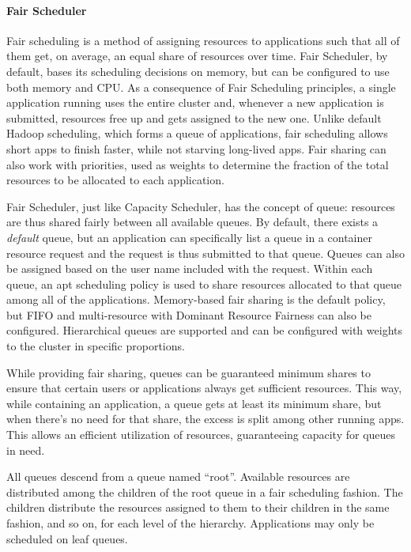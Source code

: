 \paragraph{Fair Scheduler}

Fair scheduling is a method of assigning resources to applications such that all of them get, on average, an equal share of resources over time. Fair Scheduler, by default, bases its scheduling decisions on memory, but can be configured to use both memory and CPU. As a consequence of Fair Scheduling principles, a single application running uses the entire cluster and, whenever a new application is submitted, resources free up and gets assigned to the new one. Unlike default Hadoop scheduling, which forms a queue of applications, fair scheduling allows short apps to finish faster, while not starving long-lived apps. Fair sharing can also work with priorities, used as weights to determine the fraction of the total resources to be allocated to each application.

Fair Scheduler, just like Capacity Scheduler, has the concept of queue: resources are thus shared fairly between all available queues. By default, there exists a \textit{default} queue, but an application can specifically list a queue in a container resource request and the request is thus submitted to that queue. Queues can also be assigned based on the user name included with the request. Within each queue, an apt scheduling policy is used to share resources allocated to that queue among all of the applications. Memory-based fair sharing is the default policy, but FIFO and multi-resource with Dominant Resource Fairness \cite{Ghodsi:2011:DRF:1972457.1972490} can also be configured. Hierarchical queues are supported and can be configured with weights to the cluster in specific proportions. 

While providing fair sharing, queues can be guaranteed minimum shares to ensure that certain users or applications always get sufficient resources. This way, while containing an application, a queue gets at least its minimum share, but when there's no need for that share, the excess is split among other running apps. This allows an efficient utilization of resources, guaranteeing capacity for queues in need.

All queues descend from a queue named “root”. Available resources are distributed among the children of the root queue in a fair scheduling fashion. The children distribute the resources assigned to them to their children in the same fashion, and so on, for each level of the hierarchy. Applications may only be scheduled on leaf queues.

